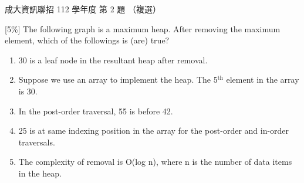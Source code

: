 \begin{pastexam}[label={px:ncku-112-prog-02}]{成大資訊聯招 112 學年度 第 2 題}
（複選）

{[5\%]} The following graph is a maximum heap. After removing the maximum element, which of the
followings is (are) true?

\begin{center}
\end{center}
\begin{enumerate}[label=(\Alph*)]
\item 30 is a leaf node in the resultant heap after removal.
\item Suppose we use an array to implement the heap. The 5$^{\text{th}}$ element in the array is 30.
\item In the post-order traversal, 55 is before 42.
\item 25 is at same indexing position in the array for the post-order and in-order traversals.
\item The complexity of removal is O(log n), where n is the number of data items in the heap.
\end{enumerate}
\end{pastexam}


